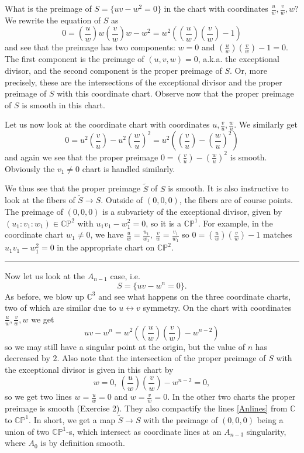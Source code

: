 \documentclass[11pt]{article}
\numberwithin{equation}{section}
\numberwithin{footnote}{section}
\newcommand{\blue}{\color{blue}}
\renewcommand{\P}{{\mathbb P}}
\newcommand{\C}{{\mathbb C}}
\begin{document}
\smallskip
What is the preimage of $S=\{uv-w^2=0\}$ in the chart with coordinates $\frac {u}{w}, \frac {v}{w},w$? We rewrite the equation of $S$ as
$$
0=\left(\frac uw\right) w \left(\frac vw\right) w  - w^2 = w^2 \left(\left(\frac uw\right) \left(\frac vw\right) -1\right)
$$
and see that the preimage has two components: $w=0$ and $  \left(\frac uw\right)\left(\frac vw\right) -1 = 0$. The first component is the preimage of $(u,v,w)=0$, a.k.a. the exceptional divisor, and the second component is the proper preimage of $S$. Or, more precisely, these are the intersections of the exceptional divisor and the proper preimage of $S$ with this coordinate chart.
Observe now that the proper preimage of $S$ is smooth in this chart.

\smallskip
Let us now look at the coordinate chart with coordinates $u, \frac vu, \frac wu$. We similarly get
$$
0=u^2\left(\frac vu \right)- u^2 \left(\frac wu\right)^2 = u^2 \left(\left(\frac vu\right) - \left(\frac wu\right)^2\right)
$$
and again we see that the proper preimage $0= \left(\frac vu\right) - \left(\frac wu\right)^2$ is smooth.
Obviously the $v_1\neq 0$ chart is handled similarly.

\smallskip
We thus see that the proper preimage $\tilde S$ of $S$ is smooth. It is also instructive to look at the fibers of $\tilde S\to S$. Outside of $(0,0,0)$, the fibers are of course points. The preimage of $(0,0,0)$ is a subvariety of the exceptional divisor, given 
by $(u_1:v_1:w_1)\in \C\P^2$ with $u_1 v_1 - w_1^2 = 0$, so it is a $\C\P^1$. For example, in the coordinate chart $w_1\neq 0$,
we have $\frac uw = \frac {u_1}{w_1},~\frac vw = \frac {v_1}{w_1}$ so $0=\left(\frac uw\right) \left(\frac vw\right) -1$ matches $u_1 v_1 - w_1^2 = 0$ in the appropriate chart on $\C\P^2$.

\smallskip
{\blue \hrule}
Now let us look at the $A_{n-1}$ case, i.e. 
$$
S=\{uv-w^n=0\}.
$$
As before, we blow up $\C^3$ and see what happens on the three coordinate charts, two of which are similar due to $u\leftrightarrow v$ symmetry. On the chart with coordinates $\frac uw, \frac vw, w$ we get
$$
uv-w^n = w^2 \left(\left(\frac uw\right) \left(\frac vw\right) -w^{n-2}\right)
$$
so we may still have a singular point at the origin, but the value of $n$ has decreased by $2$. Also note that the intersection of the proper preimage of $S$ with the exceptional divisor is given in this chart by
\begin{equation}\label{Anlines}
w=0,~ \left(\frac uw\right) \left(\frac vw\right) -w^{n-2}= 0,
\end{equation}
so we get two lines $w=\frac uw=0$ and  $w=\frac vw=0$. In the other two charts the proper preimage is smooth (Exercise 2).
They also compactify the lines \eqref{Anlines} from $\C$ to $\C\P^1$. In short, we get a map $\tilde S\to S$ with the preimage of $(0,0,0)$ being a union of two $\C\P^1$-s, which intersect as coordinate lines at an $A_{n-3}$ singularity, where $A_0$ is by definition smooth. 
\end{document}
